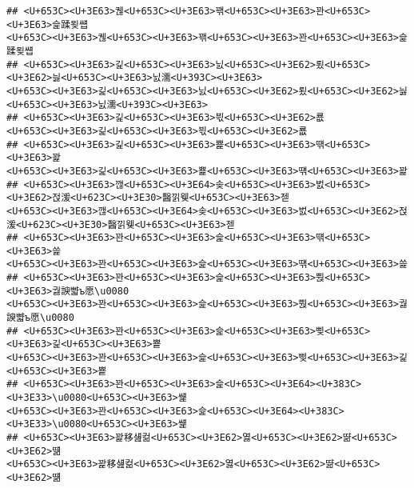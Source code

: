 \documentclass[]{article}
\begin{document}
\begin{verbatim}
## <U+653C><U+3E63>궪<U+653C><U+3E63>꽦<U+653C><U+3E63>꽌<U+653C><U+3E63>슱蹂묒썝                                                                                                                 <U+653C><U+3E63>궪<U+653C><U+3E63>꽦<U+653C><U+3E63>꽌<U+653C><U+3E63>슱蹂묒썝
## <U+653C><U+3E63>긽<U+653C><U+3E63>닔<U+653C><U+3E62>룄<U+653C><U+3E62>늻<U+653C><U+3E63>닔濡<U+393C><U+3E63>                                                                             <U+653C><U+3E63>긽<U+653C><U+3E63>닔<U+653C><U+3E62>룄<U+653C><U+3E62>늻<U+653C><U+3E63>닔濡<U+393C><U+3E63>
## <U+653C><U+3E63>긽<U+653C><U+3E63>븫<U+653C><U+3E62>룞                                                                                                                                                     <U+653C><U+3E63>긽<U+653C><U+3E63>븫<U+653C><U+3E62>룞
## <U+653C><U+3E63>긽<U+653C><U+3E63>뾽<U+653C><U+3E63>떆<U+653C><U+3E63>꽕                                                                                                                             <U+653C><U+3E63>긽<U+653C><U+3E63>뾽<U+653C><U+3E63>떆<U+653C><U+3E63>꽕
## <U+653C><U+3E63>깮<U+653C><U+3E64>솢<U+653C><U+3E63>벐<U+653C><U+3E62>젅湲<U+623C><U+3E30>醫낅웾<U+653C><U+3E63>젣                                                                 <U+653C><U+3E63>깮<U+653C><U+3E64>솢<U+653C><U+3E63>벐<U+653C><U+3E62>젅湲<U+623C><U+3E30>醫낅웾<U+653C><U+3E63>젣
## <U+653C><U+3E63>꽌<U+653C><U+3E63>슱<U+653C><U+3E63>떆<U+653C><U+3E63>쓽                                                                                                                             <U+653C><U+3E63>꽌<U+653C><U+3E63>슱<U+653C><U+3E63>떆<U+653C><U+3E63>쓽
## <U+653C><U+3E63>꽌<U+653C><U+3E63>슱<U+653C><U+3E63>뿭<U+653C><U+3E63>궗諛뺣ъ愿\u0080                                                                                                 <U+653C><U+3E63>꽌<U+653C><U+3E63>슱<U+653C><U+3E63>뿭<U+653C><U+3E63>궗諛뺣ъ愿\u0080
## <U+653C><U+3E63>꽌<U+653C><U+3E63>슱<U+653C><U+3E63>삦<U+653C><U+3E63>긽<U+653C><U+3E63>뿉                                                                                                     <U+653C><U+3E63>꽌<U+653C><U+3E63>슱<U+653C><U+3E63>삦<U+653C><U+3E63>긽<U+653C><U+3E63>뿉
## <U+653C><U+3E63>꽌<U+653C><U+3E63>슱<U+653C><U+3E64><U+383C><U+3E33>\u0080<U+653C><U+3E63>썙                                                                                                 <U+653C><U+3E63>꽌<U+653C><U+3E63>슱<U+653C><U+3E64><U+383C><U+3E33>\u0080<U+653C><U+3E63>썙
## <U+653C><U+3E63>꽕移섎컮<U+653C><U+3E62>엻<U+653C><U+3E62>땲<U+653C><U+3E62>떎                                                                                                                 <U+653C><U+3E63>꽕移섎컮<U+653C><U+3E62>엻<U+653C><U+3E62>땲<U+653C><U+3E62>떎

\end{verbatim}
\end{document}
